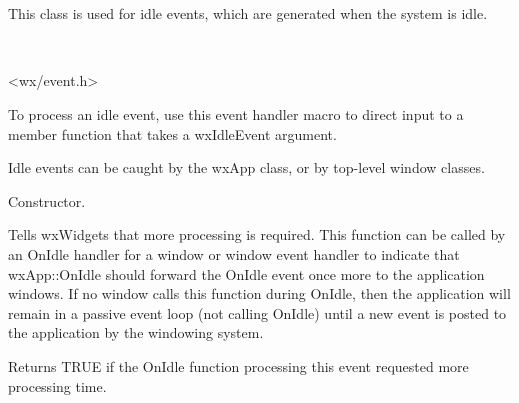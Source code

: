 \section{}\label{wxidleevent}

This class is used for idle events, which are generated when the system is idle.


\\


<wx/event.h>


To process an idle event, use this event handler macro to direct input to a member
function that takes a wxIdleEvent argument.

\twocolwidtha{7cm}
\begin{twocollist}\itemsep=0pt
\end{twocollist}%


Idle events can be caught by the wxApp class, or by top-level window classes.






Constructor.

\label{wxidleeventrequestmore}


Tells wxWidgets that more processing is required. This function can be called by an OnIdle
handler for a window or window event handler to indicate that wxApp::OnIdle should
forward the OnIdle event once more to the application windows. If no window calls this function
during OnIdle, then the application will remain in a passive event loop (not calling OnIdle) until a
new event is posted to the application by the windowing system.



\label{wxidleeventmorerequested}


Returns TRUE if the OnIdle function processing this event requested more processing time.



